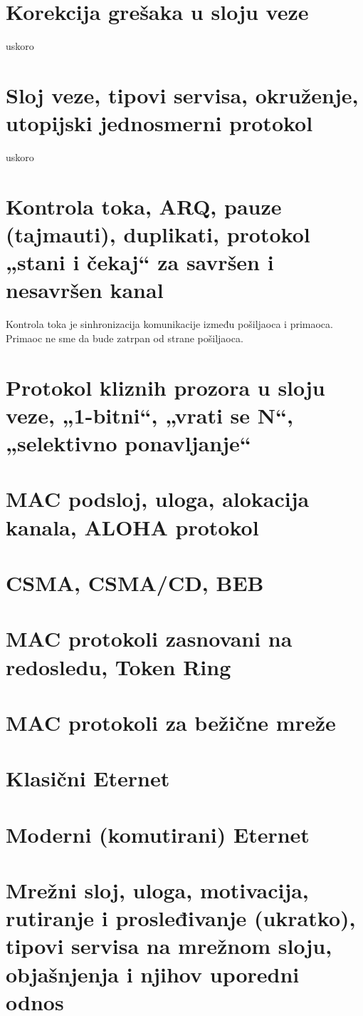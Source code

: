 \documentclass{article} %
\begin{document}
\section{Korekcija grešaka u sloju veze}
uskoro
\section{Sloj veze, tipovi servisa, okruženje, utopijski jednosmerni protokol}
uskoro
\section{Kontrola toka, ARQ, pauze (tajmauti), duplikati, protokol „stani i čekaj“ za savršen i nesavršen kanal}
Kontrola toka je sinhronizacija komunikacije između pošiljaoca i primaoca. Primaoc ne sme da bude zatrpan od strane pošiljaoca.
\section{Protokol kliznih prozora u sloju veze, „1-bitni“, „vrati se N“, „selektivno ponavljanje“}
\section{MAC podsloj, uloga, alokacija kanala, ALOHA protokol}
\section{CSMA, CSMA/CD, BEB}
\section{MAC protokoli zasnovani na redosledu, Token Ring}
\section{MAC protokoli za bežične mreže}
\section{Klasični Eternet}
\section{Moderni (komutirani) Eternet}
\section{Mrežni sloj, uloga, motivacija, rutiranje i prosleđivanje (ukratko), tipovi servisa na mrežnom sloju, objašnjenja i njihov uporedni odnos}
\end{document}
